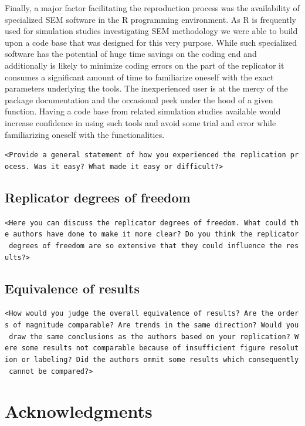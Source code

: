 \documentclass[10,a4paperpaper,]{article}
\begin{document}
Finally, a major factor facilitating the reproduction process was the
availability of specialized SEM software in the R programming
environment. As R is frequently used for simulation studies
investigating SEM methodology we were able to build upon a code base
that was designed for this very purpose. While such specialized software
has the potential of huge time savings on the coding end and
additionally is likely to minimize coding errors on the part of the
replicator it consumes a significant amount of time to familiarize
oneself with the exact parameters underlying the tools. The
inexperienced user is at the mercy of the package documentation and the
occasional peek under the hood of a given function. Having a code base
from related simulation studies available would increase confidence in
using such tools and avoid some trial and error while familiarizing
oneself with the functionalities.

\texttt{\textless{}Provide\ a\ general\ statement\ of\ how\ you\ experienced\ the\ replication\ process.\ Was\ it\ easy?\ What\ made\ it\ easy\ or\ difficult?\textgreater{}}

\subsection{Replicator degrees of freedom}

\texttt{\textless{}Here\ you\ can\ discuss\ the\ replicator\ degrees\ of\ freedom.\ What\ could\ the\ authors\ have\ done\ to\ make\ it\ more\ clear?\ Do\ you\ think\ the\ replicator\ degrees\ of\ freedom\ are\ so\ extensive\ that\ they\ could\ influence\ the\ results?\textgreater{}}

\subsection{Equivalence of results}

\texttt{\textless{}How\ would\ you\ judge\ the\ overall\ equivalence\ of\ results?\ Are\ the\ orders\ of\ magnitude\ comparable?\ Are\ trends\ in\ the\ same\ direction?\ Would\ you\ draw\ the\ same\ conclusions\ as\ the\ authors\ based\ on\ your\ replication?\ Were\ some\ results\ not\ comparable\ because\ of\ insufficient\ figure\ resolution\ or\ labeling?\ Did\ the\ authors\ ommit\ some\ results\ which\ consequently\ cannot\ be\ compared?\textgreater{}}

\section{Acknowledgments}
\end{document}
